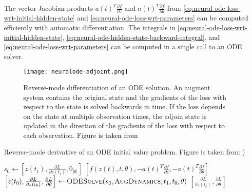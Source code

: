 The vector-Jacobian products $a(t)^T\frac{\partial f}{\partial z}$ and $a(t)^T\frac{\partial f}{\partial \theta}$ from \autoref{eq:neural-ode-loss-wrt-initial-hidden-state} and \autoref{eq:neural-ode-loss-wrt-parameters} can be computed efficiently with automatic differentiation.
The integrals in \autoref{eq:neural-ode-loss-wrt-initial-hidden-state}, \autoref{eq:neural-ode-hidden-state-backward-integral}, and \autoref{eq:neural-ode-loss-wrt-parameters} can be computed in a single call to an \gls{ODE} solver.

\begin{figure}[h]
    \centering
    \texttt{[image: neuralode-adjoint.png]}
    \caption{Reverse-mode differentiation of an ODE solution. An augment system contains the original state and the gradients of the loss with respect to the state is solved backwards in time. If the loss depends on the state at multiple observation times, the adjoin state is updated in the direction of the gradients of the loss with respect to each observation. Figure is taken from \citeauthor{chenNeuralOrdinaryDifferential2019} \cite{chenNeuralOrdinaryDifferential2019}}
    \label{fig:neuralode-adjoint}
\end{figure}

\begin{algorithm}
    \caption{Reverse-mode derivative of an ODE initial value problem. Figure is taken from \citeauthor{chenNeuralOrdinaryDifferential2019} \cite{chenNeuralOrdinaryDifferential2019})}
    \label{alg:neural-ode-reverse-mode-diff}
    \begin{algorithmic}
            \State $s_0 \gets \left[z(t_1), \frac{\partial L}{\partial z(t_1)}, 0_{|\theta|}\right]$
                \State \Return $\left[f(z(t), t, \theta), -a(t)^T\frac{\partial f}{\partial z}, -a(t)^T\frac{\partial f}{\partial \theta}\right]$
            \EndFunction
            \State $\left[z(t_0), \frac{\partial L}{\partial z(t_0)}, \frac{\partial L}{\partial \theta}\right] \gets \Call{ODESolve}{s_0, \textproc{AugDynamics}, t_1, t_0, \theta}$
            \State \Return $\left[\frac{\partial L}{\partial z(t_0)}, \frac{\partial L}{\partial \theta}\right]$
        \EndFunction
    \end{algorithmic}
\end{algorithm}